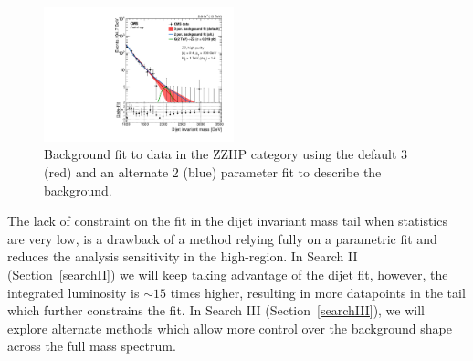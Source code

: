 \begin{figure}[h!]
\centering
\includegraphics[width=0.49\textwidth]{figures/analysis/search1/misc/CMS-PAS-EXO-15-002_Figure_004-e.pdf}
\caption{Background fit to data in the ZZHP category using the default 3 (red) and an alternate 2 (blue) parameter fit to describe the background.}
\label{fig:app:ZZHP2vs3p}
\end{figure}


The lack of constraint on the fit in the dijet invariant mass tail when statistics are very low, is a drawback of a method relying fully on a parametric fit and reduces the analysis sensitivity in the high-\mjj region. In Search II (Section~\ref{searchII}) we will keep taking advantage of the dijet fit, however, the integrated luminosity is $\sim 15$ times higher, resulting in more datapoints in the \mjj tail which further constrains the fit. In Search III (Section~\ref{searchIII}), we will explore alternate methods which allow more control over the background shape across the full mass spectrum. 










